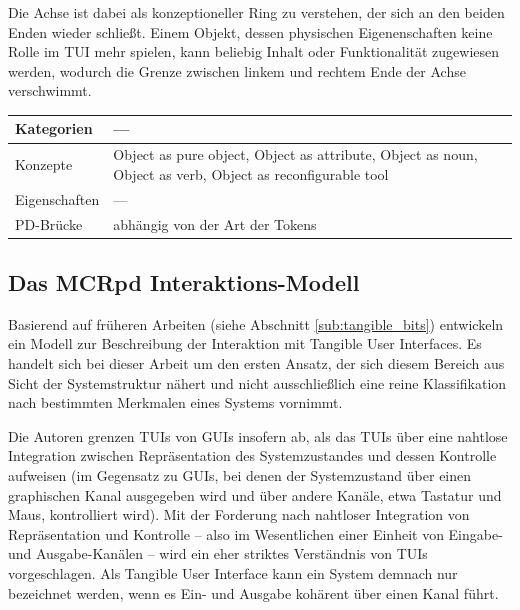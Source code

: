 Die Achse ist dabei als konzeptioneller Ring zu verstehen, der sich an den beiden Enden wieder schließt. Einem Objekt, dessen physischen Eigenenschaften keine Rolle im \gls{TUI} mehr spielen, kann beliebig Inhalt oder Funktionalität zugewiesen werden, wodurch die Grenze zwischen linkem und rechtem Ende der Achse verschwimmt.
\\[1em]
\begin{tabular}{| p{3cm} | p{10cm} |}
  \hline
  Kategorien & --- \\ \hline
  Konzepte & Object as pure object, Object as attribute, Object as noun, Object as verb, Object as reconfigurable tool  \\ \hline
  Eigenschaften & --- \\ \hline
  PD-Brücke & abhängig von der Art der Tokens  \\ \hline
\end{tabular} 

\subsection{Das MCRpd Interaktions-Modell} %
\label{sub:mcrpd}

Basierend auf früheren Arbeiten (siehe Abschnitt \ref{sub:tangible_bits}) entwickeln \citet{Ullmer00} ein Modell zur Beschreibung der Interaktion mit Tangible User Interfaces. Es handelt sich bei dieser Arbeit um den ersten Ansatz, der sich diesem Bereich aus Sicht der Systemstruktur nähert und nicht ausschließlich eine reine Klassifikation nach bestimmten Merkmalen eines Systems vornimmt.

Die Autoren grenzen \glspl{TUI} von \glspl{GUI} insofern ab, als das \glspl{TUI} über eine nahtlose Integration zwischen Repräsentation des Systemzustandes und dessen Kontrolle aufweisen (im Gegensatz zu \glspl{GUI}, bei denen der Systemzustand über einen graphischen Kanal ausgegeben wird und über andere Kanäle, etwa Tastatur und Maus, kontrolliert wird). Mit der Forderung nach nahtloser Integration von Repräsentation und Kontrolle -- also im Wesentlichen einer Einheit von Eingabe- und Ausgabe-Kanälen -- wird ein eher striktes Verständnis von \glspl{TUI} vorgeschlagen. Als Tangible User Interface kann ein System demnach nur bezeichnet werden, wenn es Ein- und Ausgabe kohärent über einen Kanal führt.


